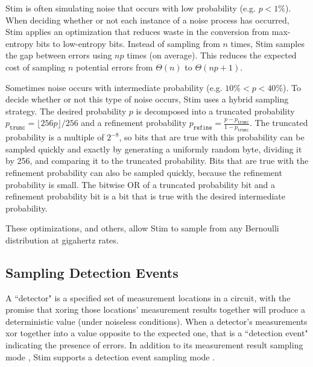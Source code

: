 \documentclass[onecolumn,unpublished]{quantumarticle}
\theoremstyle{definition}
\theoremstyle{definition}
\theoremstyle{definition}
\begin{document}
Stim is often simulating noise that occurs with low probability (e.g. $p < 1\%$).
When deciding whether or not each instance of a noise process has occurred, Stim applies an optimization that reduces waste in the conversion from max-entropy bits to low-entropy bits.
Instead of sampling from 
 $n$ times, Stim samples the gap between errors using  $np$ times (on average).
This reduces the expected cost of sampling $n$ potential errors from $\Theta(n)$ to $\Theta(np + 1)$.

Sometimes noise occurs with intermediate probability (e.g. $10\% < p < 40\%$).
To decide whether or not this type of noise occurs, Stim uses a hybrid sampling strategy.
The desired probability $p$ is decomposed into a truncated probability $p_{\texttt{trunc}} = \lfloor 256p \rfloor / 256$ and a refinement probability $p_{\texttt{refine}} = \frac{p - p_{\texttt{trunc}}}{1 - p_{\texttt{trunc}}}$.
The truncated probability is a multiple of $2^{-8}$, so bits that are true with this probability can be sampled quickly and exactly by generating a uniformly random byte, dividing it by 256, and comparing it to the truncated probability.
Bits that are true with the refinement probability can also be sampled quickly, because the refinement probability is small.
The bitwise OR of a truncated probability bit and a refinement probability bit is a bit that is true with the desired intermediate probability.

These optimizations, and others, allow Stim to sample from any Bernoulli distribution at gigahertz rates.


\subsection{Sampling Detection Events}

A ``detector" is a specified set of measurement locations in a circuit, with the promise that xoring those locations' measurement results together will produce a deterministic value (under noiseless conditions).
When a detector's measurements xor together into a value opposite to the expected one, that is a ``detection event" indicating the presence of errors.
In addition to its measurement result sampling mode , Stim supports a detection event sampling mode .
\end{document}
